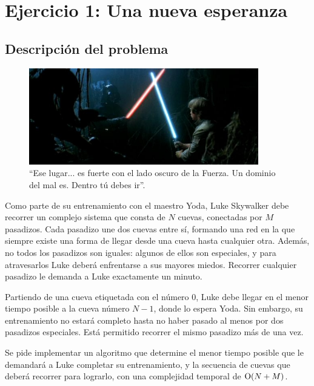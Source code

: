 \section{Ejercicio 1: Una nueva esperanza}

    \subsection{Descripción del problema}

    \begin{figure}[ht]
        \begin{center}
            \includegraphics[width=10cm]{imagenes/una_nueva_esperanza.jpg}
            \caption*{``Ese lugar... es fuerte con el lado oscuro de la Fuerza. Un
            dominio del mal es. Dentro tú debes ir''.}
        \end{center}
    \end{figure}

    Como parte de su entrenamiento con el maestro Yoda, Luke Skywalker debe
    recorrer un complejo sistema que consta de $N$ cuevas, conectadas por $M$
    pasadizos. Cada pasadizo une dos cuevas entre sí, formando una red en la
    que siempre existe una forma de llegar desde una cueva hasta cualquier
    otra. Además, no todos los pasadizos son iguales: algunos de ellos son
    especiales, y para atravesarlos Luke deberá enfrentarse a sus mayores
    miedos. Recorrer cualquier pasadizo le demanda a Luke exactamente un
    minuto.

    Partiendo de una cueva etiquetada con el número $0$, Luke debe llegar en
    el menor tiempo posible a la cueva número $N-1$, donde lo espera Yoda.
    Sin embargo, su entrenamiento no estará completo hasta no haber pasado al
    menos por dos pasadizos especiales. Está permitido recorrer el mismo
    pasadizo más de una vez.

    Se pide implementar un algoritmo que determine el menor tiempo posible que
    le demandará a Luke completar su entrenamiento, y la secuencia de cuevas
    que deberá recorrer para lograrlo, con una complejidad temporal de
    $\operatorname{O}(N + M)$.

